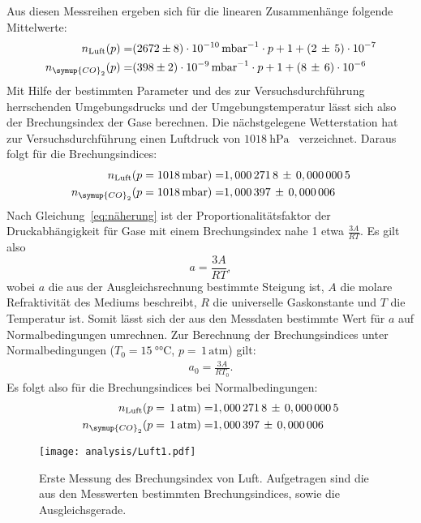 Aus diesen Messreihen ergeben sich für die linearen Zusammenhänge
folgende Mittelwerte:
%
\begin{align*}
  n_\text{Luft}(p)=&\SI{2672(8)e-10}{\milli\bar^{-1}}\cdot p + 1 + (2\,\pm\,5)\cdot 10^{-7} \\
  n_{\symup{CO}_2}(p)=&\SI{398(2)e-9}{\milli\bar^{-1}}\cdot p + 1 + (8\,\pm\,6)\cdot 10^{-6}
\end{align*}
%
Mit Hilfe der bestimmten Parameter und des zur Versuchsdurchführung herrschenden Umgebungsdrucks und der Umgebungstemperatur lässt sich also der Brechungsindex der Gase berechnen. Die nächstgelegene Wetterstation hat zur Versuchsdurchführung einen Luftdruck von $\SI{1018}{\hecto\pascal}$~\cite{wetteronline} verzeichnet. Daraus folgt für die Brechungsindices:
%
\begin{align*}
  n_\text{Luft}(p=\SI{1018}{\milli\bar})=& 1,000\,271\,8\,\pm\,0,000\,000\,5 \\
  n_{\symup{CO}_2}(p=\SI{1018}{\milli\bar})=& 1,000\,397\,\pm\,0,000\,006
\end{align*}
%
Nach Gleichung~\eqref{eq:näherung} ist der Proportionalitätsfaktor
der Druckabhängigkeit für Gase mit einem Brechungsindex nahe 1 etwa
$\frac{3A}{RT}$. Es gilt also
%
\begin{equation}
  a=\frac{3A}{RT},
\end{equation}
%
wobei $a$ die aus der Ausgleichsrechnung bestimmte Steigung ist, $A$ die molare Refraktivität des Mediums beschreibt, $R$ die universelle Gaskonstante und $T$ die Temperatur ist. Somit lässt sich der aus den Messdaten bestimmte Wert für $a$ auf Normalbedingungen umrechnen. Zur Berechnung der Brechungsindices unter Normalbedingungen ($T_0=\SI{15}{\degree\celsius}$, $p=\,1\,\text{atm}$) gilt:
%
\begin{align*}
  a_0=\frac{3A}{RT_0} .
\end{align*}
%
Es folgt also für die Brechungsindices bei Normalbedingungen:
%
\begin{align*}
  n_\text{Luft}(p=\,1\,\text{atm})=& 1,000\,271\,8\,\pm\,0,000\,000\,5 \\
  n_{\symup{CO}_2}(p=\,1\,\text{atm})=& 1,000\,397\,\pm\,0,000\,006
\end{align*}

\begin{figure}[htb]
  \centering
  \texttt{[image: analysis/Luft1.pdf]}
  \caption{Erste Messung des Brechungsindex von Luft. Aufgetragen sind die aus den Messwerten bestimmten Brechungsindices, sowie die Ausgleichsgerade.}
  \label{fig:luft1}
\end{figure}%


